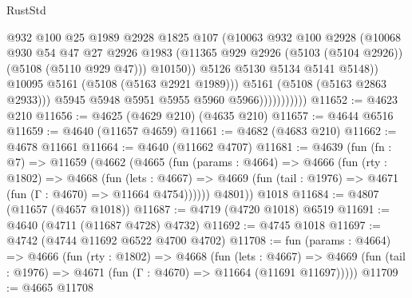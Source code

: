 \begin{lexlean}{RustStd}
\begin{coremodule}
                                  @932
                                  @100
                                  @25
                                  @1989
                                  @2928
                                  @1825
                                  @107
                                  (@10063
                                    @932
                                    @100
                                    @2928
                                    (@10068
                                      @930
                                      @54
                                      @47
                                      @27
                                      @2926
                                      @1983
                                      (@11365
                                        @929
                                        @2926
                                        (@5103 (@5104 @2926))
                                        (@5108 (@5110 @929 @47)))
                                      @10150))
                                  @5126
                                  @5130
                                  @5134
                                  @5141
                                  @5148))
                              @10095
                              @5161
                              (@5108 (@5163 @2921 @1989)))
                            @5161
                            (@5108 (@5163 @2863 @2933)))
                          @5945
                          @5948
                          @5951
                          @5955
                          @5960
                          @5966)))))))))))
@11652 := @4623 @210
@11656 := @4625 (@4629 @210) (@4635 @210)
@11657 := @4644 @6516
@11659 := @4640 (@11657 @4659)
@11661 := @4682 (@4683 @210)
@11662 := @4678 @11661
@11664 := @4640 (@11662 @4707)
@11681 := @4639
    (fun (fn : @7) =>
    @11659
      (@4662
        (@4665
          (fun (params : @4664) =>
          @4666
            (fun (rty : @1802) =>
            @4668
              (fun (lets : @4667) =>
              @4669 (fun (tail : @1976) => @4671 (fun (Γ : @4670) => @11664 @4754))))))
        @4801))
    @1018
@11684 := @4807 (@11657 (@4657 @1018))
@11687 := @4719 (@4720 @1018) @6519
@11691 := @4640 (@4711 (@11687 @4728) @4732)
@11692 := @4745 @1018
@11697 := @4742 (@4744 @11692 @6522 @4700 @4702)
@11708 := fun (params : @4664) =>
  @4666
    (fun (rty : @1802) =>
    @4668
      (fun (lets : @4667) =>
      @4669 (fun (tail : @1976) => @4671 (fun (Γ : @4670) => @11664 (@11691 @11697)))))
@11709 := @4665 @11708

\end{coremodule}
\end{lexlean}
